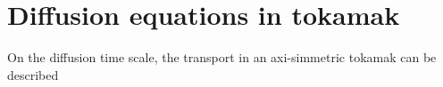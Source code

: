 \section{Diffusion equations in tokamak}

On the diffusion time scale, the transport in an axi-simmetric tokamak can be described